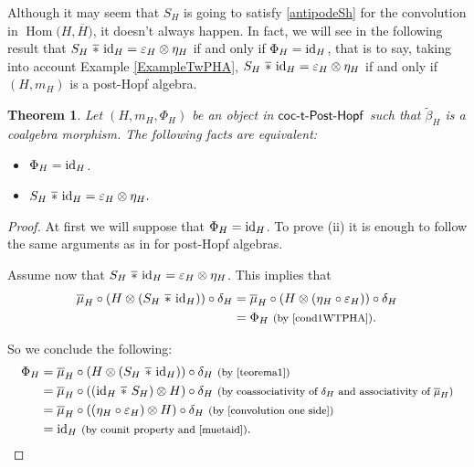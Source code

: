 \documentclass[pdftex]{sigma}
\numberwithin{equation}{section}
\newtheorem{Theorem}{Theorem}[section]
\DeclareMathOperator{\barast}{\,\overline{\ast}\,}
\DeclareMathOperator{\Hom}{Hom}
\begin{document}
Although it may seem that $S_{H}$ is going to satisfy \eqref{antipodeSh} for the convolution in $\Hom\bigl(H,\overline{H}\bigr)$, it doesn't always happen. In fact, we will see in the following result that $S_{H}\barast {\rm id}_{H}=\varepsilon_{H}\otimes\eta_{H}$ if and only if $\Phi_{H}={\rm id}_{H}$, that is to say, taking into account Example \ref{ExampleTwPHA}, $S_{H}\barast {\rm id}_{H}=\varepsilon_{H}\otimes\eta_{H}$ if and only if $(H,m_{H})$ is a post-Hopf algebra.
\begin{Theorem}\label{iffPhi=id}
Let $(H,m_{H},\Phi_{H})$ be an object in $\sf{coc}\textnormal{-}\sf{t}\textnormal{-}\sf{Post}\textnormal{-}\sf{Hopf}$ such that $\tilde{\beta}_{H}$ is a coalgebra morphism.
The following facts are equivalent:
\begin{itemize}\itemsep=0pt
\item[$(i)$]$\Phi_{H}={\rm id}_{H}$.
\item[$(ii)$] $S_{H}\barast {\rm id}_{H}=\varepsilon_{H}\otimes\eta_{H}.$
\end{itemize}
\end{Theorem}
\begin{proof}
At first we will suppose that $\Phi_{H}={\rm id}_{H}$. To prove (ii) it is enough to follow the same arguments as in \cite[Lemma 3.13]{FGR} for post-Hopf algebras.

Assume now that $S_{H}\barast {\rm id}_{H}=\varepsilon_{H}\otimes\eta_{H}$. This implies that
\begin{align}
\overline{\mu}_{H}\circ(H\otimes (S_{H}\barast {\rm id}_{H}))\circ\delta_{H}
={}&\overline{\mu}_{H}\circ(H\otimes (\eta_{H}\circ\varepsilon_{H}))\circ\delta_{H}\nonumber\\
={}&\Phi_{H}\ \text{\footnotesize\textnormal{(by \eqref{cond1WTPHA})}}.\label{teorema1}
\end{align}

So we conclude the following:
\begin{align*}
\Phi_{H}={}&\overline{\mu}_{H}\circ(H\otimes (S_{H}\barast {\rm id}_{H}))\circ\delta_{H}\ \text{\footnotesize\textnormal{(by \eqref{teorema1})}}\\
={}&\overline{\mu}_{H}\circ(({\rm id}_{H}\barast S_{H})\otimes H)\circ\delta_{H}\ \text{\footnotesize\textnormal{(by coassociativity of $\delta_{H}$ and associativity of $\overline{\mu}_{H}$)}}\\
={}&\overline{\mu}_{H}\circ((\eta_{H}\circ\varepsilon_{H})\otimes H)\circ\delta_{H}\ \text{\footnotesize\textnormal{(by \eqref{convolution one side})}}\\
={}&{\rm id}_{H}\ \text{\footnotesize\textnormal{(by counit property and \eqref{muetaid})}}.\tag*{\qed}
\end{align*}
\renewcommand{\qed}{}
\end{proof}
\end{document}
